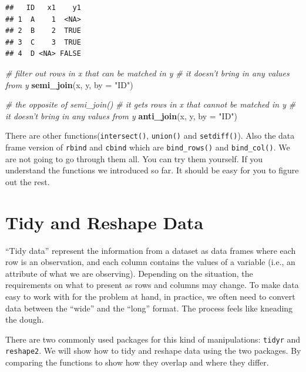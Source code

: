\documentclass[12pt,]{krantz}
\makeatletter
\newenvironment{Shaded}{\begin{snugshade}}{\end{snugshade}}
\newcommand{\CommentTok}[1]{\textcolor[rgb]{0.37,0.37,0.37}{\textit{#1}}}
\newcommand{\DataTypeTok}[1]{\textcolor[rgb]{0.27,0.27,0.27}{#1}}
\newcommand{\KeywordTok}[1]{\textcolor[rgb]{0.27,0.27,0.27}{\textbf{#1}}}
\newcommand{\NormalTok}[1]{#1}
\newcommand{\StringTok}[1]{\textcolor[rgb]{0.5,0.5,0.5}{#1}}
\newenvironment{kframe}{%
\medskip{}
\setlength{\fboxsep}{.8em}
 \def\at@end@of@kframe{}%
 \ifinner\ifhmode%
  \def\at@end@of@kframe{\end{minipage}}%
  \begin{minipage}{\columnwidth}%
 \fi\fi%
 \def\FrameCommand##1{\hskip\@totalleftmargin \hskip-\fboxsep
 \colorbox{shadecolor}{##1}\hskip-\fboxsep
     \hskip-\linewidth \hskip-\@totalleftmargin \hskip\columnwidth}%
 \MakeFramed {\advance\hsize-\width
   \@totalleftmargin\z@ \linewidth\hsize
   \@setminipage}}%
 {\par\unskip\endMakeFramed%
 \at@end@of@kframe}
\renewenvironment{Shaded}{\begin{kframe}}{\end{kframe}}
\makeatother
\begin{document}
\begin{verbatim}
##   ID   x1    y1
## 1  A    1  <NA>
## 2  B    2  TRUE
## 3  C    3  TRUE
## 4  D <NA> FALSE
\end{verbatim}

\begin{Shaded}
\begin{Highlighting}[]
\CommentTok{# filter out rows in x that can be matched in y }
\CommentTok{# it doesn't bring in any values from y }
\KeywordTok{semi_join}\NormalTok{(x, y, }\DataTypeTok{by =} \StringTok{"ID"}\NormalTok{)}
\end{Highlighting}
\end{Shaded}

\begin{Shaded}
\begin{Highlighting}[]
\CommentTok{# the opposite of  semi_join()}
\CommentTok{# it gets rows in x that cannot be matched in y}
\CommentTok{# it doesn't bring in any values from y}
\KeywordTok{anti_join}\NormalTok{(x, y, }\DataTypeTok{by =} \StringTok{"ID"}\NormalTok{)}
\end{Highlighting}
\end{Shaded}

There are other functions(\texttt{intersect()}, \texttt{union()} and \texttt{setdiff()}). Also the data frame version of \texttt{rbind} and \texttt{cbind} which are \texttt{bind\_rows()} and \texttt{bind\_col()}. We are not going to go through them all. You can try them yourself. If you understand the functions we introduced so far. It should be easy for you to figure out the rest.

\hypertarget{tidy-and-reshape-data}{%
\section{Tidy and Reshape Data}\label{tidy-and-reshape-data}}

``Tidy data'' represent the information from a dataset as data frames where each row is an observation, and each column contains the values of a variable (i.e., an attribute of what we are observing). Depending on the situation, the requirements on what to present as rows and columns may change. To make data easy to work with for the problem at hand, in practice, we often need to convert data between the ``wide'' and the ``long'' format. The process feels like kneading the dough.

There are two commonly used packages for this kind of manipulations: \texttt{tidyr} and \texttt{reshape2}. We will show how to tidy and reshape data using the two packages. By comparing the functions to show how they overlap and where they differ.
\end{document}
